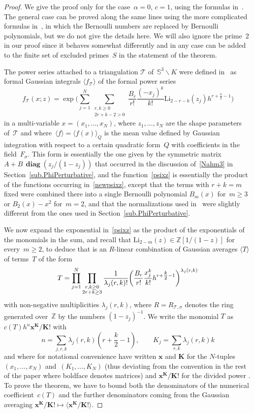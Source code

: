 \documentclass[11pt]{article}
\numberwithin{equation}{section}
\numberwithin{equation}{section}
\def\calT{\mathcal T}
\def\calT{\mathcal T}
\def\l{\lambda}
\def\a{\alpha}
\def\l{\lambda}
\def\Z{\mathbb Z}
\def\i{^{-1}}
\def\a{\alpha}
\def\l{\lambda}
\def\s{\sigma}
\def\be{\begin{equation}}
\def\ee{\end{equation}}
\def\ssm{\smallsetminus}
\def\Li{\mathrm{Li}}
\def\bK{\mathbf K}
\def\bx{\mathbf x}
\def\diag{\operatorname{\mathbf{diag}}} %
\begin{document}
\begin{proof}
We give the proof only for the case~$\a=0$, $c=1$, using the formulas in~\cite{DG}.
The general case can be proved along the same lines using the more complicated
formulas in~\cite{DG2}, in which the Bernoulli numbers are replaced by Bernoulli
polynomials, but we do not give the details here.
We will also ignore the prime~2 in our proof since it behaves somewhat differently
and in any case can be added to the finite set of excluded primes~$S$ in the statement
of the theorem.

The power series \smash{$\Phi_0^{(K,\s)}(h)$} attached to a triangulation $\calT$
of~$\mathbb S^3\ssm K$ were defined in~\cite{DG} as formal Gaussian integrals
$\langle f_{\calT}\rangle$
of the formal power series
\be
\label{psixz}
f_{\calT}(x;z) = \exp\Bigg(\sum_{j=1}^N \sum_{\substack{r, k\ge0 \\ 2r+k-2 > 0}}
\frac{B_r}{r!} \frac{(-x_j)^k}{k!} \Li_{2-r-k}(z_j)  h^{r+\tfrac k2-1} \Bigg)
\ee
in a multi-variable $x=(x_1,\dots,x_N)$, where $z_1,\dots,z_N$ are the shape parameters
of~$\calT$ and where~${\langle f\rangle=\langle f(x)\rangle_Q}$ is the mean value
defined by Gaussian integration with respect to a certain quadratic form~$Q$ with
coefficients in the field~$F_\s$. This form is essentially the one given by the
symmetric matrix $A+B \,\diag(z_j/(1-z_j))$ that occurred in the discussion
of~\eqref{Nahm3}
in Section~\ref{sub.PhiPerturbative}, and the function~\eqref{psixz} is essentially
the product of the functions occurring in~\eqref{newpsixz}, except that the terms
with $r+k=m$ fixed were combined there into a single Bernoulli polynomial $B_m(x)$
for~$m\ge3$ or $B_2(x)-x^2$ for~$m=2$, and that the normalizations used in~\cite{DG}
were slightly different from the ones used in Section~\ref{sub.PhiPerturbative}.

We now expand the exponential in~\eqref{psixz} as the product of the exponentials
of the monomials in the sum, and recall that $\Li_{2-m}(z)\in\Z[1/(1-z)]$ for
every~$m\ge2$, to deduce that \smash{$\Phi_\a^{(K,\s)}(h)=\langle f_{\calT}\rangle$} is an
$R$-linear combination of Gaussian averages $\langle T\rangle$ of terms~$T$ of the
form
\be
\label{term}
T = \prod_{j=1}^N\prod_{\substack{r, k\ge0 \\ 2r+k\ge3\substack}}
\frac1{\l_j(r,k)!} \biggl(\frac{B_r}{r!}
\frac{x_j^k}{k!} h^{r+\tfrac k2-1}\biggr)^{\l_j(r,k)}
\ee
with non-negative multiplicities $\l_j(r,k)$, where $R=R_{\calT,\s}$ denotes the
ring generated over~$\Z$ by the numbers $(1-z_j)\i$. We write the monomial $T$ as
$c(T) h^n \bx^\bK/\bK!$ with
\be
\label{nAndK}
n = \sum_{j,r,k}\l_j(r,k)\left(r+\frac k2-1\right),\qquad K_j=\sum_{r,k}\l_j(r,k)k
\ee
and where for notational convenience have written $\bx$ and $\bK$ for the
$N$-tuples $(x_1,\dots,x_N)$ and~${(K_1,\dots,K_N)}$ (thus deviating from the
convention in the rest of the paper where boldface denotes matrices) and
$\bx^\bK/\bK!$ for the divided power . To prove the theorem,
we have to bound both the denominators of the numerical coefficient~$c(T)$ and the
further denominators coming from the Gaussian averaging
$ \bx^\bK/\bK! \mapsto\big\langle\bx^\bK/\bK! \big\rangle $.


\end{proof}
\end{document}
